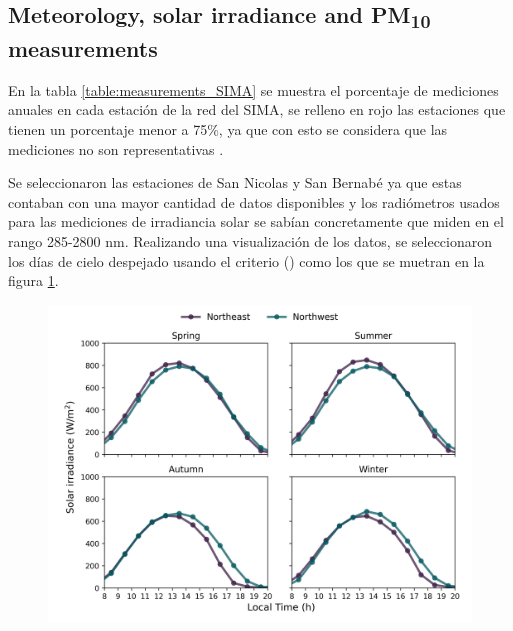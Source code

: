 \subsection{Meteorology, solar irradiance and PM\textsubscript{10} measurements}
En la tabla \ref{table:measurements_SIMA} se muestra el porcentaje de mediciones anuales en cada estación de la red del SIMA, se relleno en rojo las estaciones que tienen un porcentaje menor a 75\%, ya que con esto se considera que las mediciones no son representativas \cite{molina2019}.

Se seleccionaron las estaciones de San Nicolas y San Bernabé ya que estas contaban con una mayor cantidad de datos disponibles y los radiómetros usados para las mediciones de irradiancia solar se sabían concretamente que miden en el rango 285-2800 nm. Realizando una visualización de los datos, se seleccionaron los días de cielo despejado usando el criterio () como los que se muetran en la figura \ref{fig:clear_days}.
\begin{figure}[H]
  \centering
  \includegraphics[scale=0.5]{images/Clear_days.png}
  \caption{}
  \label{fig:clear_days}
\end{figure}